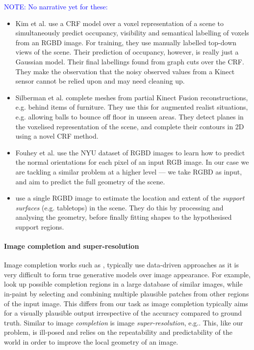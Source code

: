 \documentclass[10pt,twocolumn,letterpaper]{article}
\makeatletter
\renewcommand*{\eg}{e.g.\@\xspace}
\newcommand*{\ea}{et al.\@\xspace}
\newcommand{\note}[1]{\textcolor{blue}{NOTE: #1}}
\makeatother
\begin{document}
\note{No narrative yet for these:}
\begin{itemize}

\item Kim \ea \cite{kim-iccv-2013} use a CRF model over a voxel representation of a scene to simultaneously predict occupancy, visibility and semantical labelling of voxels from an RGBD image. 
For training, they use manually labelled top-down views of the scene. 
Their prediction of occupancy, however, is really just a Gaussian model. 
Their final labellings found from graph cuts over the CRF. 
They make the observation that the noisy observed values from a Kinect sensor cannot be relied upon and may need cleaning up.

\item Silberman \ea \cite{silberman-eccv-2014} complete meshes from partial Kinect Fusion reconstructions, \eg behind items of furniture.
They use this for augmented realist situations, \eg allowing balls to bounce off floor in unseen areas.
They detect planes in the voxelised representation of the scene, and complete their contours in 2D using a novel CRF method.


\item Fouhey \ea \cite{fouhey-iccv-2013} use the NYU dataset of RGBD images to learn how to predict the normal orientations for each pixel of an input RGB image. 
In our case we are tackling a similar problem at a higher level --- we take RGBD as input, and aim to predict the full geometry of the scene.

\item \cite{guo-iccv-2013} use a single RGBD image to estimate the location and extent of the \emph{support surfaces} (\eg tabletops) in the scene. They do this by processing and analysing the geometry, before finally fitting shapes to the hypothesised support regions. 
\end{itemize}


\paragraph{Image completion and super-resolution}
Image completion works such as \cite{hays-siggraph-2007, criminisi-cvpr-2003}, 
typically use data-driven approaches as it is very difficult to form true generative models over image appearance.
For example, \cite{hays-siggraph-2007} look up possible completion regions in a large database of similar images, while \cite{criminisi-cvpr-2003} in-paint by selecting and combining multiple plausible patches from other regions of the input image.
This differs from our task as image completion typically aims for a visually plausible output irrespective of the accuracy compared to ground truth.
Similar to image \emph{completion} is image \emph{super-resolution}, \eg \cite{macaodha-eccv-2012}. 
This, like our problem, is ill-posed and relies on the repeatability and predictability of the world in order to improve the local geometry of an image.
\end{document}
